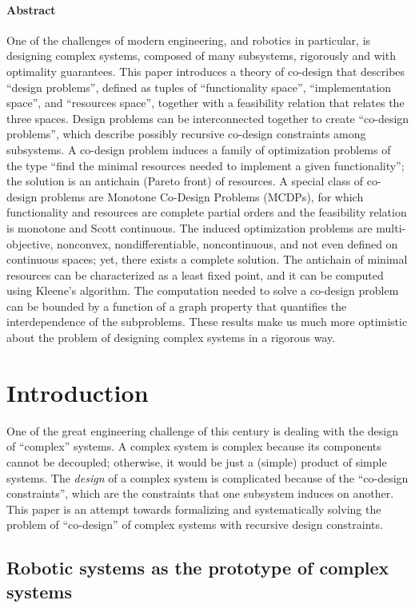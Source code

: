 \paragraph{Abstract}
One of the challenges of modern engineering, and robotics in particular,
is designing complex systems, composed of many subsystems, rigorously
and with optimality guarantees. This paper introduces a theory of
co-design that describes ``design problems'', defined as tuples
of ``functionality space'', ``implementation space'', and ``resources
space'', together with a feasibility relation that relates the three
spaces. Design problems can be interconnected together to create ``co-design
problems'', which describe possibly recursive co-design constraints
among subsystems. A co-design problem induces a family of optimization
problems of the type ``find the minimal resources needed to implement
a given functionality''; the solution is an antichain (Pareto front)
of resources. A special class of co-design problems are Monotone Co-Design
Problems (MCDPs), for which functionality and resources are complete
partial orders and the feasibility relation is monotone and Scott
continuous. The induced optimization problems are multi-objective,
nonconvex, nondifferentiable, noncontinuous, and not even defined
on continuous spaces; yet, there exists a complete solution. The antichain
of minimal resources can be characterized as a least fixed point,
and it can be computed using Kleene's algorithm. The computation needed
to solve a co-design problem can be bounded by a function of a graph
property that quantifies the interdependence of the subproblems. These
results make us much more optimistic about the problem of designing
complex systems in a rigorous way.


\section{Introduction}
One of the great engineering challenge of this
century is dealing with the design of ``complex'' systems. A complex
system is complex because its components cannot be decoupled; otherwise,
it would be just a (simple) product of simple systems. The \emph{design}
of a complex system is complicated because of the ``co-design constraints'',
which are the constraints that one subsystem induces on another. This
paper is an attempt towards formalizing and systematically solving
the problem of ``co-design'' of complex systems with recursive design
constraints.

\subsection{Robotic systems as the prototype of complex systems}

